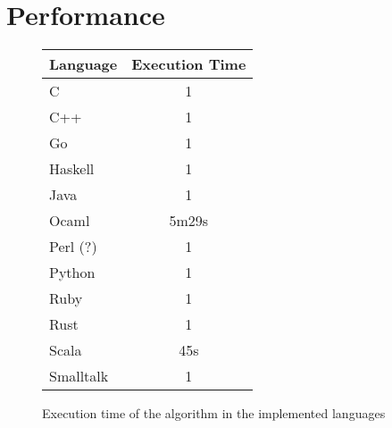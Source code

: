 \section{Performance}
\label{sec:Performance}
    \begin{figure}[!h]
    \centering
    \begin{tabular}{l|c}
    Language & Execution Time \\
    \hline
    C & 1 \\
    C++ & 1 \\
    Go & 1 \\
    Haskell & 1 \\
    Java & 1 \\
    Ocaml & 5m29s \\
    Perl (?) & 1 \\
    Python & 1 \\
    Ruby & 1 \\
    Rust & 1 \\
    Scala & 45s \\
    Smalltalk & 1 \\
    \hline
    \end{tabular}
    \caption{Execution time of the algorithm in the implemented languages}
    \label{fig:my_label}
    \end{figure}